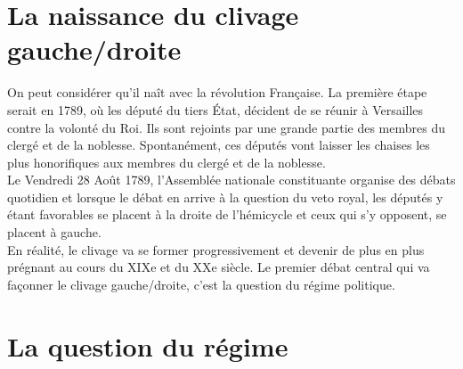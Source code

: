 \documentclass[10pt, a4paper, openany]{book}
\begin{document}
\section{La naissance du clivage gauche/droite}

On peut considérer qu'il naît avec la révolution Française. La première étape serait en 1789, où les député du tiers État, décident de se réunir à Versailles contre la volonté du Roi. Ils sont rejoints par une grande partie des membres du clergé et de la noblesse. Spontanément, ces députés vont laisser les chaises les plus honorifiques aux membres du clergé et de la noblesse. \\
Le Vendredi 28 Août 1789, l'Assemblée nationale constituante organise des débats quotidien et lorsque le débat en arrive à la question du veto royal, les députés y étant favorables se placent à la droite de l'hémicycle et ceux qui s'y opposent, se placent à gauche. \\
En réalité, le clivage va se former progressivement et devenir de plus en plus prégnant au cours du XIXe et du XXe siècle. Le premier débat central qui va façonner le clivage gauche/droite, c'est la question du régime politique. 

\section{La question du régime}
\end{document}
